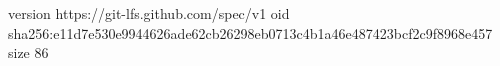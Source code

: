 version https://git-lfs.github.com/spec/v1
oid sha256:e11d7e530e9944626ade62cb26298eb0713c4b1a46e487423bcf2c9f8968e457
size 86
